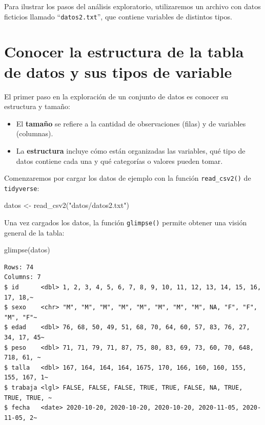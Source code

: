 \documentclass[
  spanish,
  letterpaper,
  DIV=11,
  numbers=noendperiod]{scrreprt}
\newenvironment{Shaded}{\begin{snugshade}}{\end{snugshade}}
\newcommand{\FunctionTok}[1]{\textcolor[rgb]{0.28,0.35,0.67}{#1}}
\newcommand{\NormalTok}[1]{\textcolor[rgb]{0.00,0.23,0.31}{#1}}
\newcommand{\OtherTok}[1]{\textcolor[rgb]{0.00,0.23,0.31}{#1}}
\newcommand{\StringTok}[1]{\textcolor[rgb]{0.13,0.47,0.30}{#1}}
\begin{document}
Para ilustrar los pasos del análisis exploratorio, utilizaremos un
archivo con datos ficticios llamado ``\texttt{datos2.txt}'', que
contiene variables de distintos tipos.

\section{Conocer la estructura de la tabla de datos y sus tipos de
variable}\label{conocer-la-estructura-de-la-tabla-de-datos-y-sus-tipos-de-variable}

El primer paso en la exploración de un conjunto de datos es conocer su
estructura y tamaño:

\begin{itemize}
\item
  El \textbf{tamaño} se refiere a la cantidad de observaciones (filas) y
  de variables (columnas).
\item
  La \textbf{estructura} incluye cómo están organizadas las variables,
  qué tipo de datos contiene cada una y qué categorías o valores pueden
  tomar.
\end{itemize}

Comenzaremos por cargar los datos de ejemplo con la función
\texttt{read\_csv2()} de \texttt{tidyverse}:

\begin{Shaded}
\begin{Highlighting}[]
\NormalTok{datos }\OtherTok{\textless{}{-}} \FunctionTok{read\_csv2}\NormalTok{(}\StringTok{"datos/datos2.txt"}\NormalTok{)}
\end{Highlighting}
\end{Shaded}

Una vez cargados los datos, la función \texttt{glimpse()} permite
obtener una visión general de la tabla:

\begin{Shaded}
\begin{Highlighting}[]
\FunctionTok{glimpse}\NormalTok{(datos)}
\end{Highlighting}
\end{Shaded}

\begin{verbatim}
Rows: 74
Columns: 7
$ id      <dbl> 1, 2, 3, 4, 5, 6, 7, 8, 9, 10, 11, 12, 13, 14, 15, 16, 17, 18,~
$ sexo    <chr> "M", "M", "M", "M", "M", "M", "M", "M", NA, "F", "F", "M", "F"~
$ edad    <dbl> 76, 68, 50, 49, 51, 68, 70, 64, 60, 57, 83, 76, 27, 34, 17, 45~
$ peso    <dbl> 71, 71, 79, 71, 87, 75, 80, 83, 69, 73, 60, 70, 648, 718, 61, ~
$ talla   <dbl> 167, 164, 164, 164, 1675, 170, 166, 160, 160, 155, 155, 167, 1~
$ trabaja <lgl> FALSE, FALSE, FALSE, TRUE, TRUE, FALSE, NA, TRUE, TRUE, TRUE, ~
$ fecha   <date> 2020-10-20, 2020-10-20, 2020-10-20, 2020-11-05, 2020-11-05, 2~
\end{verbatim}
\end{document}
